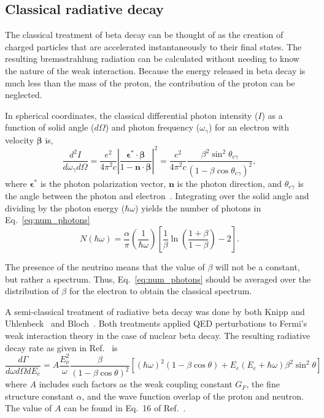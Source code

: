 \documentclass[oneside,12pt]{memoir}
\begin{document}
\subsection{Classical radiative decay}
\label{sec:class_rad_decay}
The classical treatment of beta decay can be thought of as the creation of charged particles that are accelerated instantaneously to their final states. The resulting brem\-sstrah\-lung radiation can be calculated without needing to know the nature of the weak interaction. Because the energy released in beta decay is much less than the mass of the proton, the contribution of the proton can be neglected.\par
In spherical coordinates, the classical differential photon intensity ($I$) as a function of solid angle ($d\Omega$) and photon frequency ($\omega_\gamma$) for an electron with velocity $\boldsymbol\beta$ is,
\begin{equation}
	\frac{d^2I}{d\omega_\gamma d\Omega}=
	\frac{e^2}{4\pi^2c}\left|\frac{\boldsymbol{\epsilon}^*
		\cdot\boldsymbol{\beta}}
		{1-\mathbf{n}\cdot\boldsymbol{\beta}}\right|^2
	=\frac{e^2}{4\pi^2c}\frac{\beta^2\sin^2\theta_{e\gamma}}
	{\left(1-\beta\cos\theta_{e\gamma}\right)^2},
\end{equation}
where $\boldsymbol{\epsilon}^*$ is the photon polarization vector, $\mathbf{n}$ is the photon direction, and $\theta_{e\gamma}$ is the angle between the photon and electron~\cite{jackson99}. Integrating over the solid angle and dividing by the photon energy ($\hbar\omega$) yields the number of photons in Eq.~\ref{eq:num_photons}
\begin{equation}
	\label{eq:num_photons}
	N\left(\hbar\omega\right)=\frac{\alpha}{\pi}
	\left(\frac{1}{\hbar\omega}\right)\left[\frac{1}{\beta}
	\ln\left(\frac{1+\beta}{1-\beta}\right)-2\right].
\end{equation}\par
The presence of the neutrino means that the value of $\beta$ will not be a constant, but rather a spectrum. Thus, Eq.~\ref{eq:num_photons} should be averaged over the distribution of $\beta$ for the electron to obtain the classical spectrum.\par
A semi-classical treatment of radiative beta decay was done by both Knipp and Uhlenbeck~\cite{Knipp36} and Bloch~\cite{Bloch36}. Both treatments applied QED perturbations to Fermi's weak interaction theory in the case of nuclear beta decay. The resulting radiative decay rate as given in Ref.~\cite{Bloch36} is
\begin{equation}
	\frac{d\Gamma}{d\omega d\Omega dE_e}=
	A\frac{E^2_{\bar{\nu}}}{\omega}
	\frac{\beta}{\left(1-\beta\cos\theta\right)^2}
	\left[\left(\hbar\omega\right)^2
		\left(1-\beta\cos\theta\right)+
		E_e\left(E_e+\hbar\omega\right)\beta^2\sin^2\theta
	\right]
\end{equation}
where $A$ includes such factors as the weak coupling constant $G_F$, the fine structure constant $\alpha$, and the wave function overlap of the proton and neutron. The value of $A$ can be found in Eq.~16 of Ref.~\cite{Bloch36}.
\end{document}

